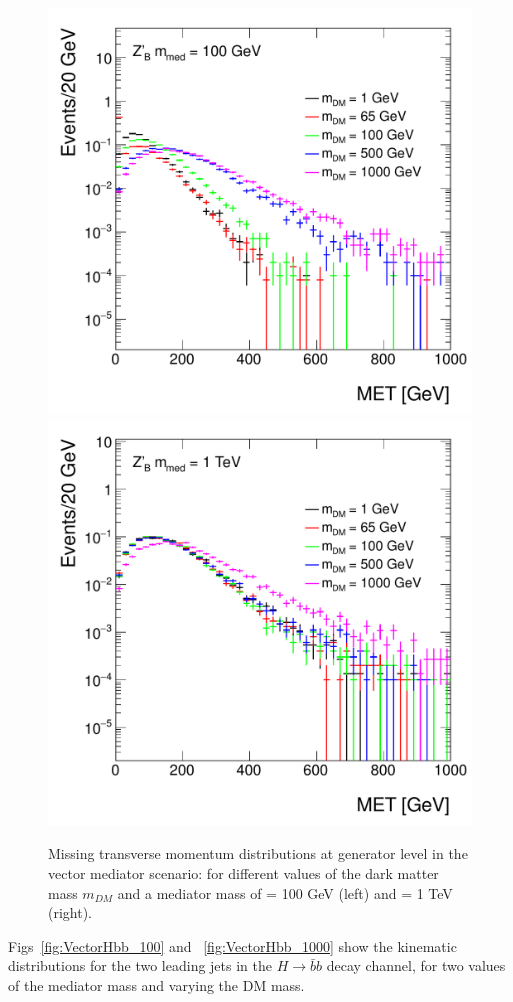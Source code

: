 \begin{figure}[hbpt!]
	\includegraphics[width=0.49\linewidth]{figures/EW/monoH/zprime_100_MET_et_Log}
	\includegraphics[width=0.49\linewidth]{figures/EW/monoH/zprime_1000_MET_et_Log}
	\caption{Missing transverse momentum distributions at generator level in the vector 
		mediator scenario: for different values of the dark matter mass $m_{DM}$ 
		and a mediator mass of \mmed = 100 GeV (left) and \mmed = 1 TeV (right).
		\label{fig:metVectorMass} }
\end{figure}


Figs~\ref{fig:VectorHbb_100} and ~\ref{fig:VectorHbb_1000} show the kinematic distributions for the two leading jets
in the $H \to \bar b b$ decay channel, for two values of the mediator mass and varying the DM mass.  


